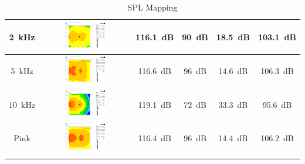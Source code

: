 \begin{longtable}[H]{|c|c|c|c|c|c|}
            \multicolumn{1}{|c|}{\SI{2}{\kHz}}  & \multicolumn{1}{c|}{\includegraphics[width=0.5\textwidth]{Images/spl_plot_2khz.png}}       & \multicolumn{1}{c|}{\SI{116.1}{\dB}} & \multicolumn{1}{c|}{\SI{90}{\dB}}  & \multicolumn{1}{c|}{\SI{18.5}{\dB}} & \SI{103.1}{\dB} \\ \hline
            \multicolumn{1}{|c|}{\SI{5}{\kHz}}  & \multicolumn{1}{c|}{\includegraphics[width=0.5\textwidth]{Images/spl_plot_5khz.png}}       & \multicolumn{1}{c|}{\SI{116.6}{\dB}} & \multicolumn{1}{c|}{\SI{96}{\dB}}  & \multicolumn{1}{c|}{\SI{14.6}{\dB}} & \SI{106.3}{\dB} \\ \hline
            \multicolumn{1}{|c|}{\SI{10}{\kHz}} & \multicolumn{1}{c|}{\includegraphics[width=0.5\textwidth]{Images/spl_plot_10khz.png}}      & \multicolumn{1}{c|}{\SI{119.1}{\dB}} & \multicolumn{1}{c|}{\SI{72}{\dB}}  & \multicolumn{1}{c|}{\SI{33.3}{\dB}} & \SI{95.6}{\dB} \\ \hline
            \multicolumn{1}{|c|}{Pink}          & \multicolumn{1}{c|}{\includegraphics[width=0.5\textwidth]{Images/spl_plot_pink_none.png}}  & \multicolumn{1}{c|}{\SI{116.4}{\dB}} & \multicolumn{1}{c|}{\SI{96}{\dB}}  & \multicolumn{1}{c|}{\SI{14.4}{\dB}} & \SI{106.2}{\dB} \\ \hline
            
            \caption{SPL Mapping}
            \label{tab:spl_mapping}
        \end{longtable}

